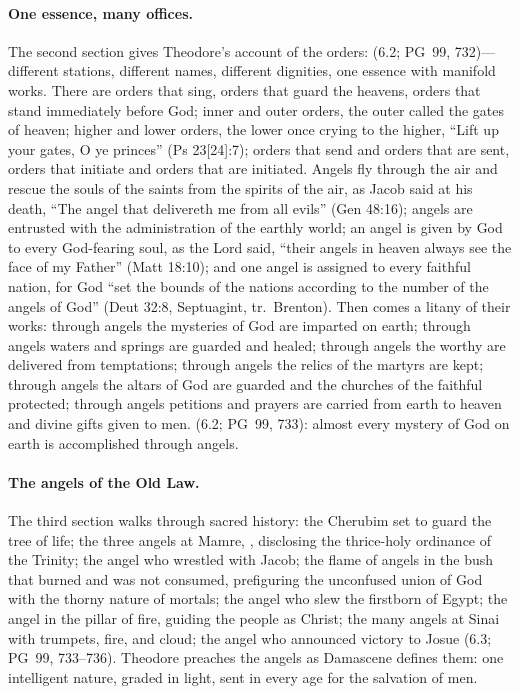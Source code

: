 \paragraph{One essence, many offices.} The second section gives Theodore's
account of the orders:  (6.2; PG~99, 732)---different stations, different names, different
dignities, one essence with manifold works. There are orders that sing,
orders that guard the heavens, orders that stand immediately before God;
inner and outer orders, the outer called the gates of heaven; higher and
lower orders, the lower once crying to the higher, ``Lift up your gates, O
ye princes'' (Ps 23[24]:7); orders that send and orders that are sent,
orders that initiate and orders that are initiated. Angels fly through the
air and rescue the souls of the saints from the spirits of the air, as
Jacob said at his death, ``The angel that delivereth me from all evils''
(Gen 48:16); angels are entrusted with the administration of the earthly
world; an angel is given by God to every God-fearing soul, as the Lord
said, ``their angels in heaven always see the face of my Father'' (Matt
18:10); and one angel is assigned to every faithful nation, for God
``set the bounds of the nations according to the number of the angels of
God'' (Deut 32:8, Septuagint, tr.\ Brenton). Then comes a litany of their works:
through angels the mysteries of God are imparted on earth; through angels
waters and springs are guarded and healed; through angels the worthy are
delivered from temptations; through angels the relics of the martyrs are
kept; through angels the altars of God are guarded and the churches of the
faithful protected; through angels petitions and prayers are carried from
earth to heaven and divine gifts given to men.  (6.2; PG~99, 733): almost
every mystery of God on earth is accomplished through angels.

\paragraph{The angels of the Old Law.} The third section walks through
sacred history: the Cherubim set to guard the tree of life; the three angels
at Mamre, , disclosing the
thrice-holy ordinance of the Trinity; the angel who wrestled with Jacob; the
flame of angels in the bush that burned and was not consumed, prefiguring
the unconfused union of God with the thorny nature of mortals; the angel who
slew the firstborn of Egypt; the angel in the pillar of fire, guiding the
people as Christ; the many angels at Sinai with trumpets, fire, and cloud;
the angel who announced victory to Josue (6.3; PG~99, 733--736). Theodore
preaches the angels as Damascene defines them: one intelligent nature,
graded in light, sent in every age for the salvation of men.

